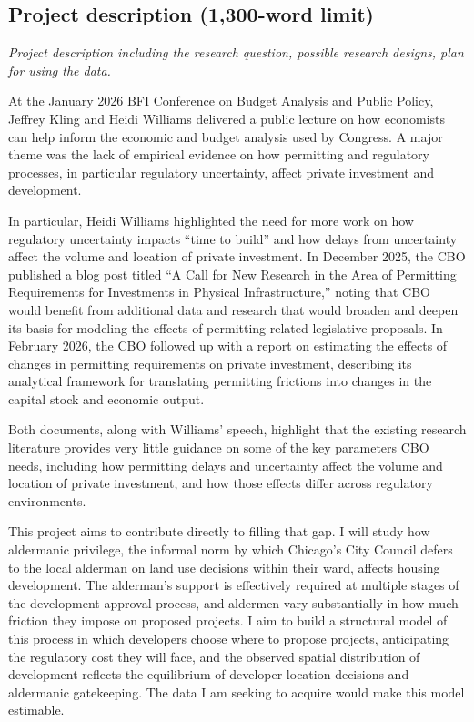 \documentclass[12pt]{article}
\begin{document}
\subsection*{Project description (1,300-word limit)}

\textit{Project description including the research question, possible research designs, plan for using the data.}

\medskip

At the January 2026 BFI Conference on Budget Analysis and Public Policy, Jeffrey Kling and Heidi Williams delivered a public lecture on how economists can help inform the economic and budget analysis used by Congress. A major theme was the lack of empirical evidence on how permitting and regulatory processes, in particular regulatory uncertainty, affect private investment and development. 

In particular, Heidi Williams highlighted the need for more work on how regulatory uncertainty impacts ``time to build'' and how delays from uncertainty affect the volume and location of private investment.
In December 2025, the CBO published a blog post titled ``A Call for New Research in the Area of Permitting Requirements for Investments in Physical Infrastructure,'' noting that CBO would benefit from additional data and research that would broaden and deepen its basis for modeling the effects of permitting-related legislative proposals. 
In February 2026, the CBO followed up with a report on estimating the effects of changes in permitting requirements on private investment, describing its analytical framework for translating permitting frictions into changes in the capital stock and economic output.

Both documents, along with Williams' speech, highlight that the existing research literature provides very little guidance on some of the key parameters CBO needs, including how permitting delays and uncertainty affect the volume and location of private investment, and how those effects differ across regulatory environments.

This project aims to contribute directly to filling that gap. I will study how aldermanic privilege, the informal norm by which Chicago's City Council defers to the local alderman on land use decisions within their ward, affects housing development. The alderman's support is effectively required at multiple stages of the development approval process, and aldermen vary substantially in how much friction they impose on proposed projects. I aim to build a structural model of this process in which developers choose where to propose projects, anticipating the regulatory cost they will face, and the observed spatial distribution of development reflects the equilibrium of developer location decisions and aldermanic gatekeeping. The data I am seeking to acquire would make this model estimable.
\end{document}
